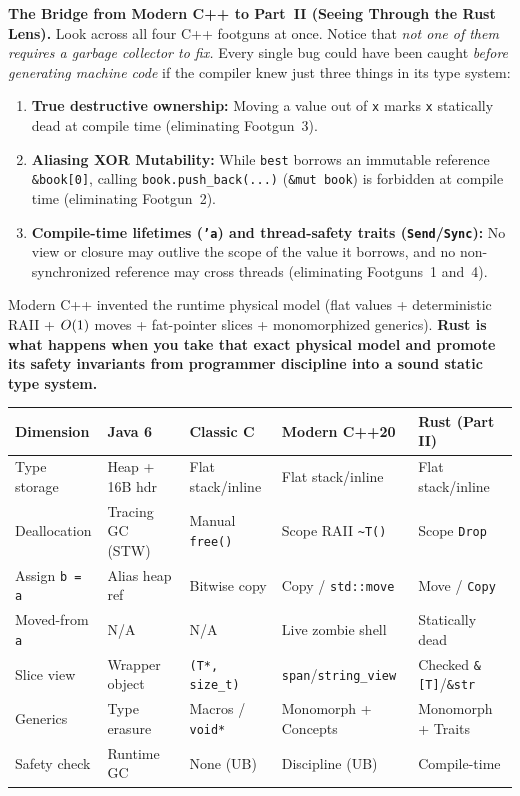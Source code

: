 \begin{focusbox}
\textbf{The Bridge from Modern C++ to Part~II (Seeing Through the Rust Lens).}
Look across all four C++ footguns at once. Notice that \emph{not one of them requires a garbage collector to fix.} Every single bug could have been caught \emph{before generating machine code} if the compiler knew just three things in its type system:
\begin{enumerate}
  \item \textbf{True destructive ownership:} Moving a value out of \texttt{x} marks \texttt{x} statically dead at compile time (eliminating Footgun~3).
  \item \textbf{Aliasing XOR Mutability:} While \texttt{best} borrows an immutable reference \texttt{\&book[0]}, calling \texttt{book.push\_back(...)} (\texttt{\&mut book}) is forbidden at compile time (eliminating Footgun~2).
  \item \textbf{Compile-time lifetimes (\texttt{'a}) and thread-safety traits (\texttt{Send}/\texttt{Sync}):} No view or closure may outlive the scope of the value it borrows, and no non-synchronized reference may cross threads (eliminating Footguns~1 and~4).
\end{enumerate}
Modern C++ invented the runtime physical model (flat values + deterministic RAII + $O(1)$ moves + fat-pointer slices + monomorphized generics). \textbf{Rust is what happens when you take that exact physical model and promote its safety invariants from programmer discipline into a sound static type system.}
\end{focusbox}

\begin{center}
\footnotesize
\setlength{\tabcolsep}{4.5pt}
\begin{tabular}{@{}lllll@{}}
\toprule
\textbf{Dimension} & \textbf{Java 6} & \textbf{Classic C} & \textbf{Modern C++20} & \textbf{Rust (Part II)} \\
\midrule
Type storage & Heap + 16B hdr & Flat stack/inline & Flat stack/inline & Flat stack/inline \\
Deallocation & Tracing GC (STW) & Manual \texttt{free()} & Scope RAII \texttt{\textasciitilde T()} & Scope \texttt{Drop} \\
Assign \texttt{b = a} & Alias heap ref & Bitwise copy & Copy / \texttt{std::move} & Move / \texttt{Copy} \\
Moved-from \texttt{a} & N/A & N/A & Live zombie shell & Statically dead \\
Slice view & Wrapper object & \texttt{(T*, size\_t)} & \texttt{span}/\texttt{string\_view} & Checked \texttt{\&[T]}/\texttt{\&str} \\
Generics & Type erasure & Macros / \texttt{void*} & Monomorph + Concepts & Monomorph + Traits \\
Safety check & Runtime GC & None (UB) & Discipline (UB) & Compile-time \\
\bottomrule
\end{tabular}
\end{center}

